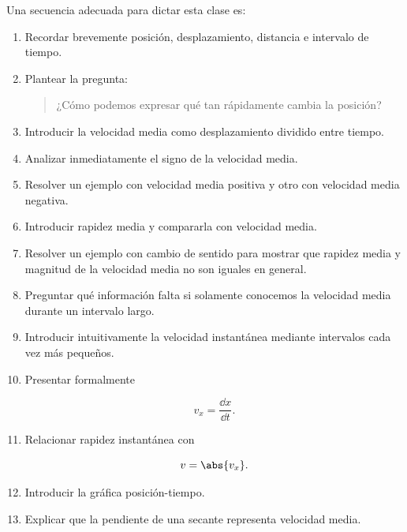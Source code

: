 \begin{notapedagogica}
Una secuencia adecuada para dictar esta clase es:

\begin{enumerate}

    \item Recordar brevemente posición, desplazamiento, distancia e intervalo
    de tiempo.

    \item Plantear la pregunta:

    \begin{quote}
    ¿Cómo podemos expresar qué tan rápidamente cambia la posición?
    \end{quote}

    \item Introducir la velocidad media como desplazamiento dividido entre
    tiempo.

    \item Analizar inmediatamente el signo de la velocidad media.

    \item Resolver un ejemplo con velocidad media positiva y otro con
    velocidad media negativa.

    \item Introducir rapidez media y compararla con velocidad media.

    \item Resolver un ejemplo con cambio de sentido para mostrar que
    rapidez media y magnitud de la velocidad media no son iguales en
    general.

    \item Preguntar qué información falta si solamente conocemos la velocidad
    media durante un intervalo largo.

    \item Introducir intuitivamente la velocidad instantánea mediante
    intervalos cada vez más pequeños.

    \item Presentar formalmente

    \[
    v_x=\frac{\dd x}{\dd t}.
    \]

    \item Relacionar rapidez instantánea con

    \[
    v=\abs{v_x}.
    \]

    \item Introducir la gráfica posición-tiempo.

    \item Explicar que la pendiente de una secante representa velocidad
    media.


\end{enumerate}
\end{notapedagogica}
